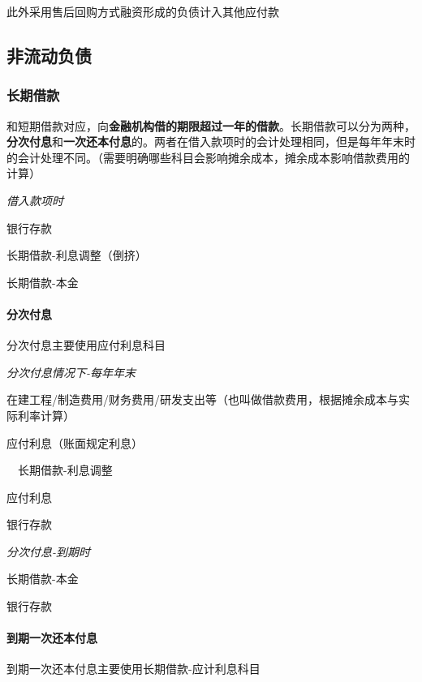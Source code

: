 \documentclass[UTF8,12pt]{ctexart}
\newenvironment{Dr}{%
	\begin{list}{}%
		{
			\setlength{\leftmargin}{2em}
			\setlength{\labelwidth}{2em}
			\setlength{\labelsep}{0pt}
			\setlength{\itemindent}{0pt}
			\setlength{\listparindent}{0pt}
			\setlength{\parsep}{0pt}
			\setlength{\topsep}{0pt}
		}
		\item[\textbf{借：}]
	}{%
	\end{list}
}
\newenvironment{Cr}{%
	\begin{list}{}%
		{
			\setlength{\leftmargin}{2em}
			\setlength{\labelwidth}{2em}
			\setlength{\labelsep}{0pt}
			\setlength{\itemindent}{0pt}
			\setlength{\listparindent}{0pt}
			\setlength{\parsep}{0pt}
			\setlength{\topsep}{0pt}
		}
		\item[\textbf{贷：}]
	}{%
	\end{list}
}
\numberwithin{equation}{section} %
\numberwithin{figure}{section}
\numberwithin{table}{section}
\begin{document}
	此外采用售后回购方式融资形成的负债计入其他应付款
	
	
	\subsection{非流动负债}
	\subsubsection{长期借款}
	和短期借款对应，向\textbf{金融机构借的期限超过一年的借款}。长期借款可以分为两种，\textbf{分次付息}和\textbf{一次还本付息}的。两者在借入款项时的会计处理相同，但是每年年末时的会计处理不同。（需要明确哪些科目会影响摊余成本，摊余成本影响借款费用的计算）
	
	\textit{借入款项时}
	
	\begin{Dr}
		银行存款
		
		长期借款-利息调整（倒挤）
	\end{Dr}	
	\begin{Cr}
		长期借款-本金
	\end{Cr}

	\paragraph{分次付息} 分次付息主要使用应付利息科目

	\textit{分次付息情况下-每年年末}
	
	\begin{Dr}
		在建工程/制造费用/财务费用/研发支出等（也叫做借款费用，根据摊余成本与实际利率计算）
	\end{Dr}
	\begin{Cr}
		应付利息（账面规定利息）
		
		\ \ 长期借款-利息调整
	\end{Cr}
	\begin{Dr}
		应付利息
	\end{Dr}
	\begin{Cr}
		银行存款
	\end{Cr}

	
	\textit{分次付息-到期时}
	
	\begin{Dr}
		长期借款-本金
	\end{Dr}
	\begin{Cr}
		银行存款
	\end{Cr}

	\paragraph{到期一次还本付息} 到期一次还本付息主要使用长期借款-应计利息科目
\end{document}
